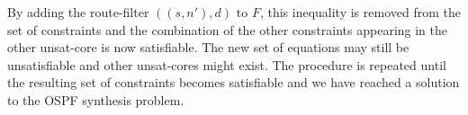 By adding the route-filter $((s,n'),d)$ to $F$, this inequality is removed from the set of constraints
and the combination of the other constraints appearing in the other unsat-core is now satisfiable.
The new set of equations may still be unsatisfiable and other unsat-cores might exist. 
The procedure is repeated until the resulting set of constraints becomes satisfiable
and we have reached a solution to the OSPF synthesis problem.


